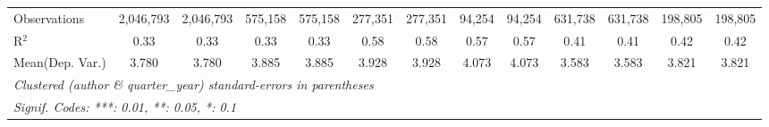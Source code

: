 \begin{tabular}{lcccccccccccc}
   Observations                             & 2,046,793    & 2,046,793   & 575,158       & 575,158     & 277,351 & 277,351 & 94,254  & 94,254  & 631,738       & 631,738        & 198,805       & 198,805\\  
   R$^2$                                    & 0.33         & 0.33        & 0.33          & 0.33        & 0.58    & 0.58    & 0.57    & 0.57    & 0.41          & 0.41           & 0.42          & 0.42\\  
Mean(Dep. Var.) & 3.780 & 3.780 & 3.885 & 3.885 & 3.928 & 3.928 & 4.073 & 4.073 & 3.583 & 3.583 & 3.821 & 3.821 \\
   \midrule \midrule
   \multicolumn{13}{l}{\emph{Clustered (author \& quarter\_year) standard-errors in parentheses}}\\
   \multicolumn{13}{l}{\emph{Signif. Codes: ***: 0.01, **: 0.05, *: 0.1}}\\
\end{tabular}
\par\endgroup
